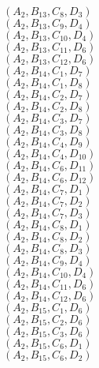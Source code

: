 \documentclass[14pt]{article}
\begin{document}
    $({A}_{2}, {B}_{13}, {C}_{8}, {D}_{3}) $ \\ 
    $({A}_{2}, {B}_{13}, {C}_{9}, {D}_{4}) $ \\ 
    $({A}_{2}, {B}_{13}, {C}_{10}, {D}_{4}) $ \\ 
    $({A}_{2}, {B}_{13}, {C}_{11}, {D}_{6}) $ \\ 
    $({A}_{2}, {B}_{13}, {C}_{12}, {D}_{6}) $ \\ 
    $({A}_{2}, {B}_{14}, {C}_{1}, {D}_{7}) $ \\ 
    $({A}_{2}, {B}_{14}, {C}_{1}, {D}_{8}) $ \\ 
    $({A}_{2}, {B}_{14}, {C}_{2}, {D}_{7}) $ \\ 
    $({A}_{2}, {B}_{14}, {C}_{2}, {D}_{8}) $ \\ 
    $({A}_{2}, {B}_{14}, {C}_{3}, {D}_{7}) $ \\ 
    $({A}_{2}, {B}_{14}, {C}_{3}, {D}_{8}) $ \\ 
    $({A}_{2}, {B}_{14}, {C}_{4}, {D}_{9}) $ \\ 
    $({A}_{2}, {B}_{14}, {C}_{4}, {D}_{10}) $ \\ 
    $({A}_{2}, {B}_{14}, {C}_{6}, {D}_{11}) $ \\ 
    $({A}_{2}, {B}_{14}, {C}_{6}, {D}_{12}) $ \\ 
    $({A}_{2}, {B}_{14}, {C}_{7}, {D}_{1}) $ \\ 
    $({A}_{2}, {B}_{14}, {C}_{7}, {D}_{2}) $ \\ 
    $({A}_{2}, {B}_{14}, {C}_{7}, {D}_{3}) $ \\ 
    $({A}_{2}, {B}_{14}, {C}_{8}, {D}_{1}) $ \\ 
    $({A}_{2}, {B}_{14}, {C}_{8}, {D}_{2}) $ \\ 
    $({A}_{2}, {B}_{14}, {C}_{8}, {D}_{3}) $ \\ 
    $({A}_{2}, {B}_{14}, {C}_{9}, {D}_{4}) $ \\ 
    $({A}_{2}, {B}_{14}, {C}_{10}, {D}_{4}) $ \\ 
    $({A}_{2}, {B}_{14}, {C}_{11}, {D}_{6}) $ \\ 
    $({A}_{2}, {B}_{14}, {C}_{12}, {D}_{6}) $ \\ 
    $({A}_{2}, {B}_{15}, {C}_{1}, {D}_{6}) $ \\ 
    $({A}_{2}, {B}_{15}, {C}_{2}, {D}_{6}) $ \\ 
    $({A}_{2}, {B}_{15}, {C}_{3}, {D}_{6}) $ \\ 
    $({A}_{2}, {B}_{15}, {C}_{6}, {D}_{1}) $ \\ 
    $({A}_{2}, {B}_{15}, {C}_{6}, {D}_{2}) $ \\ 
\end{document}
